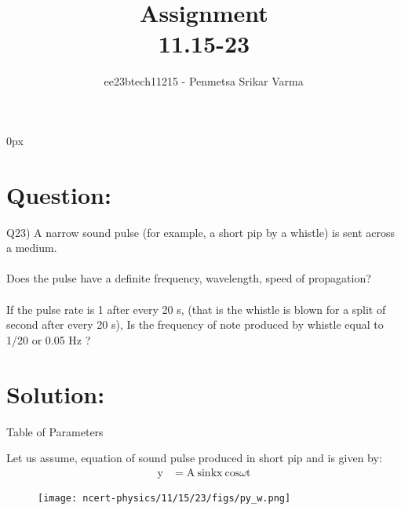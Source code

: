 \documentclass[beamer]{IEEEtran}
\theoremstyle{remark}
\begin{document}
\parindent 0px


\title{Assignment\\[1ex]11.15-23}
\author{ee23btech11215 - Penmetsa Srikar Varma$^{}$%
}
\maketitle
\newpage
\bigskip

\renewcommand{\thefigure}{\theenumi}
\renewcommand{\thetable}{\theenumi}
\section*{Question:}
Q23) A narrow sound pulse (for example, a short pip by a whistle) is sent across a
medium.\\\\  Does the pulse have a definite  frequency,  wavelength,  speed
of propagation?\\\\  If the pulse rate is 1 after every 20 s, (that is the whistle is
blown for a split of second after every 20 s), Is the frequency of note produced
by whistle equal to 1/20 or 0.05 Hz ?
\section*{Solution:}
{\centering
Table of Parameters\\
}
\begin{table}[h]
    \centering
    
    \label{tab:t1}
\end{table}

 Let us assume, equation of sound pulse  produced in short pip and is given by:\\
\begin{align}
    \label{a1}
    \text{y}&=\text{A}\ \text{sin}\text{kx}\ \text{cos}\omega\text{t}
\end{align}
\begin{figure}[h]
    \centering
    \texttt{[image: ncert-physics/11/15/23/figs/py\_w.png]}
    \label{fig:enter-label}
\end{figure}
\end{document}
